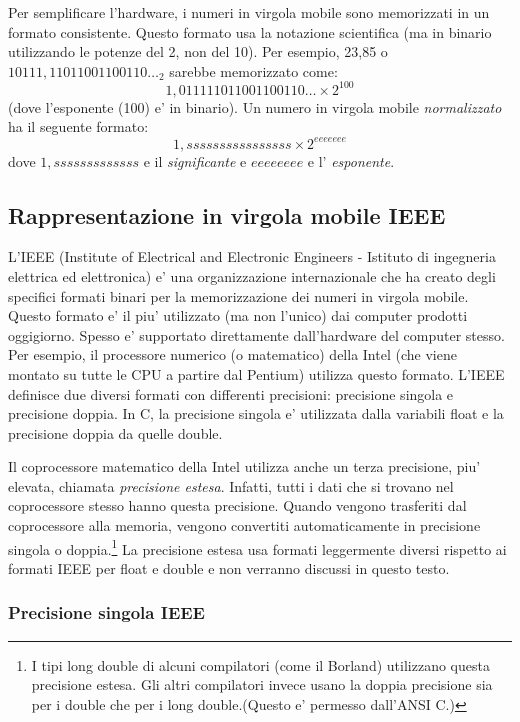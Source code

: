 Per semplificare l'hardware, i numeri in virgola mobile sono memorizzati
in un formato consistente. Questo formato usa la notazione scientifica (ma 
in binario utilizzando le potenze del 2, non del 10). Per esempio, 23,85
o $10111,11011001100110\ldots_2$ sarebbe memorizzato come:
\[ 1,011111011001100110\ldots \times 2^{100} \]
(dove l'esponente (100) e' in binario). Un numero in virgola mobile 
\emph{normalizzato} ha il seguente formato:
\[ 1,ssssssssssssssss \times 2^{eeeeeee} \]
dove $1,sssssssssssss$ e il \emph{significante} e $eeeeeeee$ e l'
\emph{esponente}.

\subsection{Rappresentazione in virgola mobile IEEE}

L'IEEE (Institute of Electrical and Electronic Engineers - Istituto di ingegneria
elettrica ed elettronica) e' una organizzazione internazionale che ha
creato degli specifici formati binari per la memorizzazione dei numeri
in virgola mobile. Questo formato e' il piu' utilizzato (ma non l'unico)
dai computer prodotti oggigiorno. Spesso e' supportato direttamente
dall'hardware del computer stesso. Per esempio, il processore numerico
(o matematico) della Intel (che viene montato su tutte le CPU a 
partire dal Pentium) utilizza questo formato. L'IEEE definisce due
diversi formati con differenti precisioni: precisione singola e 
precisione doppia. In C, la precisione singola e' utilizzata dalla variabili
{\code float} e la precisione doppia da quelle {\code double}.

Il coprocessore matematico della Intel utilizza anche un terza precisione,
piu' elevata, chiamata \emph{precisione estesa}. Infatti, tutti i dati che 
si trovano nel coprocessore stesso hanno questa precisione. Quando vengono
trasferiti dal coprocessore alla memoria, vengono convertiti automaticamente
in precisione singola o doppia.\footnote{I tipi {\code long double} di alcuni
compilatori (come il Borland) utilizzano questa precisione estesa. Gli altri
compilatori invece usano la doppia precisione sia per i {\code double} che
per i  {\code long double}.(Questo e' permesso dall'ANSI C.)} La precisione
estesa usa formati leggermente diversi rispetto ai formati IEEE per float
e double  e non verranno discussi in questo testo.

\subsubsection{Precisione singola IEEE}

